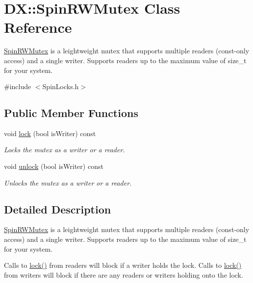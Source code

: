 \hypertarget{class_d_x_1_1_spin_r_w_mutex}{\section{D\-X\-:\-:Spin\-R\-W\-Mutex Class Reference}
\label{class_d_x_1_1_spin_r_w_mutex}
}


\hyperlink{class_d_x_1_1_spin_r_w_mutex}{Spin\-R\-W\-Mutex} is a leightweight mutex that supports multiple readers (const-\/only access) and a single writer. Supports readers up to the maximum value of size\-\_\-t for your system.  




{\ttfamily \#include $<$Spin\-Locks.\-h$>$}

\subsection*{Public Member Functions}
\begin{DoxyCompactItemize}
\item 
void \hyperlink{class_d_x_1_1_spin_r_w_mutex_a8fe3a96117f0c9594135747f12548add}{lock} (bool is\-Writer) const 
\begin{DoxyCompactList}\small\item\em Locks the mutex as a writer or a reader. \end{DoxyCompactList}\item 
\hypertarget{class_d_x_1_1_spin_r_w_mutex_a5475d76504c9c0519bea4fa68c995f9d}{void \hyperlink{class_d_x_1_1_spin_r_w_mutex_a5475d76504c9c0519bea4fa68c995f9d}{unlock} (bool is\-Writer) const }\label{class_d_x_1_1_spin_r_w_mutex_a5475d76504c9c0519bea4fa68c995f9d}

\begin{DoxyCompactList}\small\item\em Unlocks the mutex as a writer or a reader. \end{DoxyCompactList}\end{DoxyCompactItemize}


\subsection{Detailed Description}
\hyperlink{class_d_x_1_1_spin_r_w_mutex}{Spin\-R\-W\-Mutex} is a leightweight mutex that supports multiple readers (const-\/only access) and a single writer. Supports readers up to the maximum value of size\-\_\-t for your system. 

Calls to \hyperlink{class_d_x_1_1_spin_r_w_mutex_a8fe3a96117f0c9594135747f12548add}{lock()} from readers will block if a writer holds the lock. Calls to \hyperlink{class_d_x_1_1_spin_r_w_mutex_a8fe3a96117f0c9594135747f12548add}{lock()} from writers will block if there are any readers or writers holding onto the lock.

